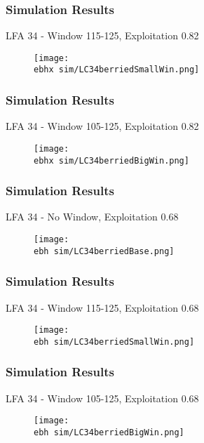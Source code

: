 \documentclass{beamer}
\newcommand{\ebh}{\string~/bio.data/bio.lobster/figures/LFA3438Framework2019/} %
\newcommand{\ebhx}{\string~/bio.data/bio.lobster/figures/LFA3438Framework2019/figures/Brad/} %
\begin{document}
\begin{frame}
\frametitle{Simulation Results}
LFA 34 - Window 115-125, Exploitation 0.82
\begin{figure}
        \begin{center}
            \texttt{[image: \\ebhx sim/LC34berriedSmallWin.png]}
        \end{center}
    \end{figure}
\end{frame}


\begin{frame}
\frametitle{Simulation Results}
LFA 34 - Window 105-125, Exploitation 0.82
\begin{figure}
        \begin{center}
            \texttt{[image: \\ebhx sim/LC34berriedBigWin.png]}
        \end{center}
    \end{figure}
\end{frame}



\begin{frame}
\frametitle{Simulation Results}
LFA 34 - No Window, Exploitation 0.68
\begin{figure}
        \begin{center}
            \texttt{[image: \\ebh sim/LC34berriedBase.png]}
        \end{center}
    \end{figure}
\end{frame}



\begin{frame}
\frametitle{Simulation Results}
LFA 34 - Window 115-125, Exploitation 0.68
\begin{figure}
        \begin{center}
            \texttt{[image: \\ebh sim/LC34berriedSmallWin.png]}
        \end{center}
    \end{figure}
\end{frame}


\begin{frame}
\frametitle{Simulation Results}
LFA 34 - Window 105-125, Exploitation 0.68
\begin{figure}
        \begin{center}
            \texttt{[image: \\ebh sim/LC34berriedBigWin.png]}
        \end{center}
    \end{figure}
\end{frame}
\end{document}
